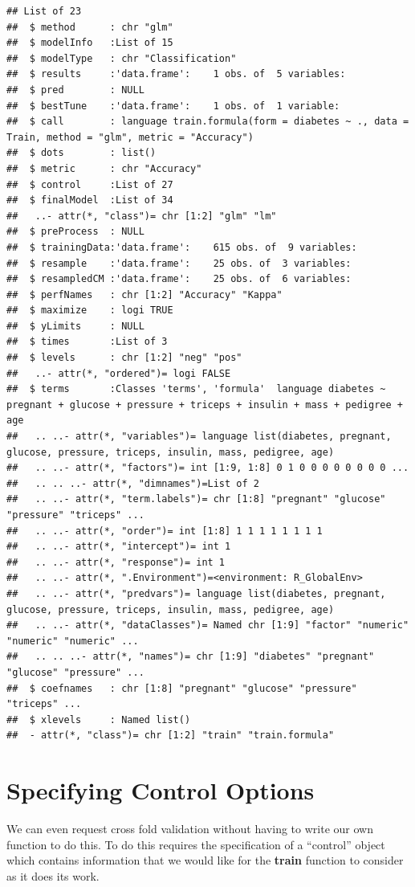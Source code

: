\documentclass[
]{book}
\begin{document}
\begin{verbatim}
## List of 23
##  $ method      : chr "glm"
##  $ modelInfo   :List of 15
##  $ modelType   : chr "Classification"
##  $ results     :'data.frame':    1 obs. of  5 variables:
##  $ pred        : NULL
##  $ bestTune    :'data.frame':    1 obs. of  1 variable:
##  $ call        : language train.formula(form = diabetes ~ ., data = Train, method = "glm", metric = "Accuracy")
##  $ dots        : list()
##  $ metric      : chr "Accuracy"
##  $ control     :List of 27
##  $ finalModel  :List of 34
##   ..- attr(*, "class")= chr [1:2] "glm" "lm"
##  $ preProcess  : NULL
##  $ trainingData:'data.frame':    615 obs. of  9 variables:
##  $ resample    :'data.frame':    25 obs. of  3 variables:
##  $ resampledCM :'data.frame':    25 obs. of  6 variables:
##  $ perfNames   : chr [1:2] "Accuracy" "Kappa"
##  $ maximize    : logi TRUE
##  $ yLimits     : NULL
##  $ times       :List of 3
##  $ levels      : chr [1:2] "neg" "pos"
##   ..- attr(*, "ordered")= logi FALSE
##  $ terms       :Classes 'terms', 'formula'  language diabetes ~ pregnant + glucose + pressure + triceps + insulin + mass + pedigree + age
##   .. ..- attr(*, "variables")= language list(diabetes, pregnant, glucose, pressure, triceps, insulin, mass, pedigree, age)
##   .. ..- attr(*, "factors")= int [1:9, 1:8] 0 1 0 0 0 0 0 0 0 0 ...
##   .. .. ..- attr(*, "dimnames")=List of 2
##   .. ..- attr(*, "term.labels")= chr [1:8] "pregnant" "glucose" "pressure" "triceps" ...
##   .. ..- attr(*, "order")= int [1:8] 1 1 1 1 1 1 1 1
##   .. ..- attr(*, "intercept")= int 1
##   .. ..- attr(*, "response")= int 1
##   .. ..- attr(*, ".Environment")=<environment: R_GlobalEnv> 
##   .. ..- attr(*, "predvars")= language list(diabetes, pregnant, glucose, pressure, triceps, insulin, mass, pedigree, age)
##   .. ..- attr(*, "dataClasses")= Named chr [1:9] "factor" "numeric" "numeric" "numeric" ...
##   .. .. ..- attr(*, "names")= chr [1:9] "diabetes" "pregnant" "glucose" "pressure" ...
##  $ coefnames   : chr [1:8] "pregnant" "glucose" "pressure" "triceps" ...
##  $ xlevels     : Named list()
##  - attr(*, "class")= chr [1:2] "train" "train.formula"
\end{verbatim}

\hypertarget{specifying-control-options}{%
\section{Specifying Control Options}\label{specifying-control-options}}

We can even request cross fold validation without having to write our own function to do this. To do this requires the specification of a ``control'' object which contains information that we would like for the \textbf{train} function to consider as it does its work.
\end{document}
